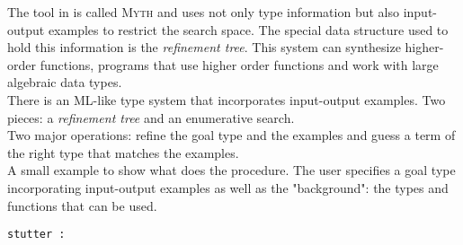The tool in \cite{Osera:2015:TPS:2737924.2738007} is called \textsc{Myth} and uses not only type information but also input-output examples to restrict the search space. The special data structure used to hold this information is the \emph{refinement tree}. This system can synthesize higher-order functions, programs that use higher order functions and work with large algebraic data types.\\
There is an ML-like type system that incorporates input-output examples. Two pieces: a \emph{refinement tree} and an enumerative search.\\
Two major operations: refine the goal type and the examples and guess a term of the right type that matches the examples.\\
A small example to show what does the procedure. The user specifies a goal type incorporating input-output examples as well as the "background": the types and functions that can be used.
\begin{lstlisting}
stutter : 
\end{lstlisting}



